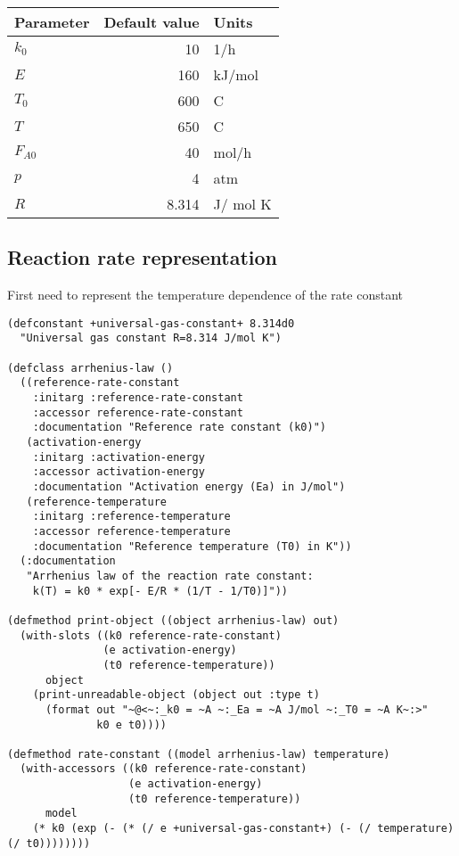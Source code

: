\documentclass[listings, a4paper, fleqn, pdftex, 12pt, openany, oneside, final]{memoir}
\theoremstyle{definition}
\begin{document}
\begin{center}
\begin{tabular}{lrl}
Parameter & Default value & Units\\
\hline
\(k_{0}\) & 10 & 1/h\\
\(E\) & 160 & kJ/mol\\
\(T_{0}\) & 600 & C\\
\(T\) & 650 & C\\
\(F_{A0}\) & 40 & mol/h\\
\(p\) & 4 & atm\\
\(R\) & 8.314 & J/ mol K\\
\end{tabular}
\end{center}

\subsection{Reaction rate representation}
\label{sec:orgheadline2}
First need to represent the temperature dependence of the rate
constant

\begin{verbatim}
(defconstant +universal-gas-constant+ 8.314d0
  "Universal gas constant R=8.314 J/mol K")

(defclass arrhenius-law ()
  ((reference-rate-constant
    :initarg :reference-rate-constant
    :accessor reference-rate-constant
    :documentation "Reference rate constant (k0)")
   (activation-energy
    :initarg :activation-energy
    :accessor activation-energy
    :documentation "Activation energy (Ea) in J/mol")
   (reference-temperature
    :initarg :reference-temperature
    :accessor reference-temperature
    :documentation "Reference temperature (T0) in K"))
  (:documentation
   "Arrhenius law of the reaction rate constant:
    k(T) = k0 * exp[- E/R * (1/T - 1/T0)]"))

(defmethod print-object ((object arrhenius-law) out)
  (with-slots ((k0 reference-rate-constant)
               (e activation-energy)
               (t0 reference-temperature))
      object
    (print-unreadable-object (object out :type t)
      (format out "~@<~:_k0 = ~A ~:_Ea = ~A J/mol ~:_T0 = ~A K~:>"
              k0 e t0))))

(defmethod rate-constant ((model arrhenius-law) temperature)
  (with-accessors ((k0 reference-rate-constant)
                   (e activation-energy)
                   (t0 reference-temperature))
      model
    (* k0 (exp (- (* (/ e +universal-gas-constant+) (- (/ temperature) (/ t0))))))))
\end{verbatim}
\end{document}
